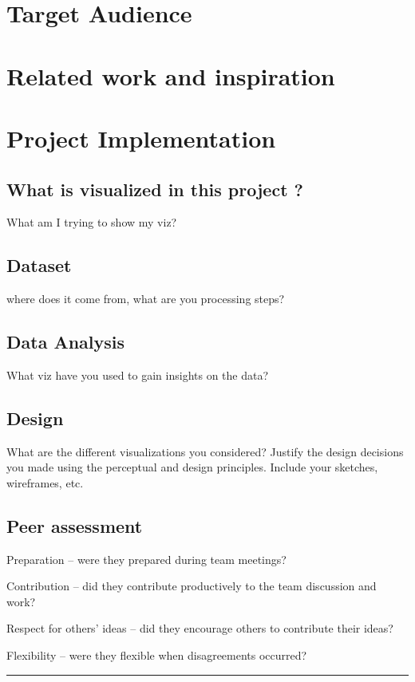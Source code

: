 \documentclass[a4paper]{article}
\begin{document}
\section{Target Audience}

\section{Related work and inspiration}

\section{Project Implementation}

\subsection{What is visualized in this project ?}
What am I trying to show my viz?

\subsection{Dataset}
where does it come from, what are you processing steps?

\subsection{Data Analysis}
What viz have you used to gain insights on the data?

\subsection{Design}
What are the different visualizations you considered? Justify the design decisions you made using the perceptual and design principles.
Include your sketches, wireframes, etc.

\subsection{Peer assessment}

Preparation – were they prepared during team meetings?

Contribution – did they contribute productively to the team discussion and work?

Respect for others’ ideas – did they encourage others to contribute their ideas?

Flexibility – were they flexible when disagreements occurred?
\vspace{2cm}
\hrule
\end{document}
